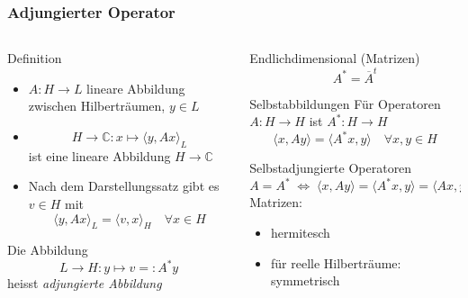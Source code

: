 %
%
%
\bgroup
\begin{frame}[t]
\setlength{\abovedisplayskip}{5pt}
\setlength{\belowdisplayskip}{5pt}
\frametitle{Adjungierter Operator}
\vspace{-20pt}
\begin{columns}[t,onlytextwidth]
\begin{column}{0.48\textwidth}
\begin{block}{Definition}
\begin{itemize}
\item
$A\colon H\to L$ lineare Abbildung zwischen Hilberträumen, $y\in L$
\item
\[
H\to\mathbb{C}
:
x\mapsto \langle y, Ax\rangle_L
\]
ist eine lineare Abbildung $H\to\mathbb{C}$
\item
Nach dem Darstellungssatz gibt es $v\in H$ mit
\[
\langle y,Ax\rangle_L = \langle v,x\rangle_H
\quad 
\forall x\in H
\]
\end{itemize}
Die Abbildung 
\[
L\to H
:
y\mapsto v =: A^*y
\]
heisst {\em adjungierte Abbildung}
\end{block}
\end{column}
\begin{column}{0.48\textwidth}
\begin{block}{Endlichdimensional (Matrizen)}
\[
A^* = \overline{A}^t
\]
\end{block}
\vspace{-8pt}
\begin{block}{Selbstabbildungen}
Für Operatoren $A\colon H\to H$ ist $A^*\colon H\to H$
\[
\langle x,Ay\rangle
=
\langle A^*x, y\rangle
\quad
\forall x,y\in H
\]
\end{block}
\vspace{-8pt}
\begin{block}{Selbstadjungierte Operatoren}
\[
A=A^*
\;\Leftrightarrow\;
\langle x,Ay \rangle
=
\langle A^*x,y \rangle
=
\langle Ax,y \rangle
\]
Matrizen:
\begin{itemize}
\item hermitesch
\item für reelle Hilberträume: symmetrisch
\end{itemize}
\end{block}
\end{column}
\end{columns}
\end{frame}
\egroup
